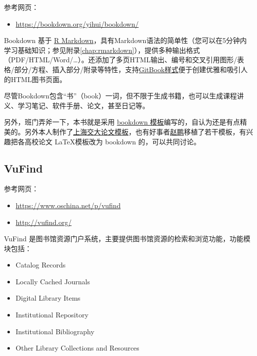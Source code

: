 \documentclass[doctor,openright,twoside]{sjtuthesis}
\providecommand{\tightlist}{%
    \setlength{\itemsep}{0pt}\setlength{\parskip}{0pt}}
\theoremstyle{plain}
\theoremstyle{definition}
\theoremstyle{remark}
\theoremstyle{ocrenumbox}
\theoremstyle{plain}
\begin{document}
参考网页：

\begin{itemize}
\tightlist
\item
  \url{https://bookdown.org/yihui/bookdown/}
\end{itemize}

Bookdown 基于 \href{http://rmarkdown.rstudio.com}{R
Markdown}，具有Markdown语法的简单性（您可以在5分钟内学习基础知识；参见附录\ref{chap:rmarkdown}），提供多种输出格式（PDF/HTML/Word/\ldots{}）。还添加了多页HTML输出、编号和交叉引用图形/表格/部分/方程、插入部分/附录等特性，支持\href{https://www.gitbook.com}{GitBook样式}便于创建优雅和吸引人的HTML图书页面。

尽管Bookdown包含``书''（book）一词，但不限于生成书籍，也可以生成课程讲义、学习笔记、软件手册、论文，甚至日记等。

另外，班门弄斧一下，本书就是采用
\href{https://github.com/bubifengyun/deepin-bible}{bookdown
模板}编写的，自认为还是有点精美的。另外本人制作了\href{https://github.com/bubifengyun/SJTUThesis-Rmd}{上海交大论文模板}，也有好事者\href{https://github.com/pzhaonet/bookdownplus}{赵鹏}移植了若干模板，有兴趣把各高校论文
\LaTeX 模板改为 bookdown 的，可以共同讨论。

\hypertarget{vufind}{%
\subsection{VuFind}\label{vufind}}

参考网页：

\begin{itemize}
\tightlist
\item
  \url{https://www.oschina.net/p/vufind}
\item
  \url{http://vufind.org/}
\end{itemize}

VuFind
是图书馆资源门户系统，主要提供图书馆资源的检索和浏览功能，功能模块包括：

\begin{itemize}
\tightlist
\item
  Catalog Records
\item
  Locally Cached Journals
\item
  Digital Library Items
\item
  Institutional Repository
\item
  Institutional Bibliography
\item
  Other Library Collections and Resources
\end{itemize}
\end{document}
